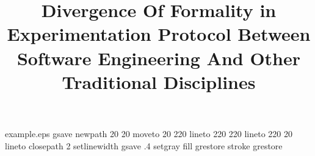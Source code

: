 %
%
%
%
%
\begin{filecontents*}{example.eps}
gsave
newpath
  20 20 moveto
  20 220 lineto
  220 220 lineto
  220 20 lineto
closepath
2 setlinewidth
gsave
  .4 setgray fill
grestore
stroke
grestore
\end{filecontents*}
%
\RequirePackage{fix-cm}
%
\documentclass[twocolumn]{svjour3}          %
%
\smartqed  %
%
\usepackage{graphicx}
%
%
%
\usepackage{graphicx}
\usepackage{tabulary}
\usepackage{multirow}
\usepackage{enumerate}
\usepackage{hyperref}
\usepackage{color}
\usepackage{soul}
\usepackage[latin1]{inputenc}
\usepackage{comment}
\usepackage{rotating}
\usepackage{framed}

\newcommand{\rodrinote}[1]{\textcolor{blue}{[RODRI:#1]}}

%
%


\title{Divergence Of Formality in Experimentation Protocol Between Software Engineering And Other Traditional Disciplines%
}

